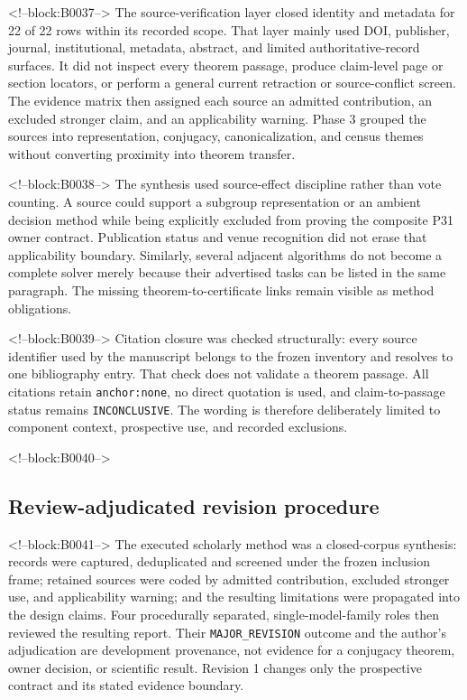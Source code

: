 \documentclass[11pt]{article}
\begin{document}
<!--block:B0037-->
The source-verification layer closed identity and metadata for 22 of 22
rows within its recorded scope. That layer mainly used DOI, publisher,
journal, institutional, metadata, abstract, and limited
authoritative-record surfaces. It did not inspect every theorem passage,
produce claim-level page or section locators, or perform a general
current retraction or source-conflict screen. The evidence matrix then
assigned each source an admitted contribution, an excluded stronger
claim, and an applicability warning. Phase 3 grouped the sources into
representation, conjugacy, canonicalization, and census themes without
converting proximity into theorem transfer.

<!--block:B0038-->
The synthesis used source-effect discipline rather than vote counting.
A source could support a subgroup representation or an ambient decision
method while being explicitly excluded from proving the composite P31
owner contract. Publication status and venue recognition did not erase
that applicability boundary. Similarly, several adjacent algorithms do
not become a complete solver merely because their advertised tasks can
be listed in the same paragraph. The missing theorem-to-certificate
links remain visible as method obligations.

<!--block:B0039-->
Citation closure was checked structurally: every source identifier used
by the manuscript belongs to the frozen inventory and resolves to one
bibliography entry. That check does not validate a theorem passage. All
citations retain \texttt{anchor:none}, no direct quotation is used, and
claim-to-passage status remains \texttt{INCONCLUSIVE}. The wording is
therefore deliberately limited to component context, prospective use,
and recorded exclusions.

<!--block:B0040-->
\hypertarget{32-review-adjudicated-revision-procedure}{%
\subsection{Review-adjudicated revision
procedure}\label{32-review-adjudicated-revision-procedure}}

<!--block:B0041-->
The executed scholarly method was a closed-corpus synthesis: records were
captured, deduplicated and screened under the frozen inclusion frame; retained
sources were coded by admitted contribution, excluded stronger use, and
applicability warning; and the resulting limitations were propagated into the
design claims. Four procedurally separated, single-model-family roles then
reviewed the resulting report. Their \texttt{MAJOR\_REVISION} outcome and the
author's adjudication are development provenance, not evidence for a conjugacy
theorem, owner decision, or scientific result. Revision 1 changes only the
prospective contract and its stated evidence boundary.
\end{document}
